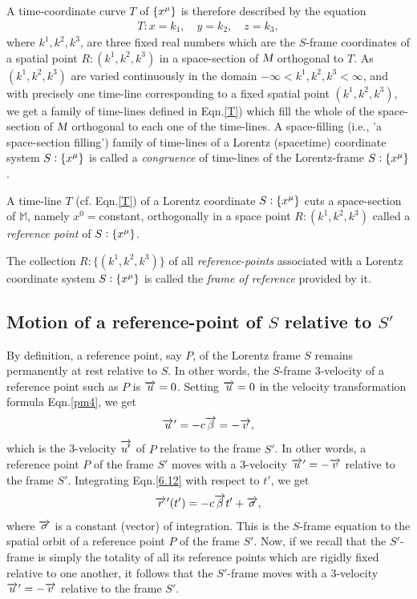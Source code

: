\newpage
A time-coordinate curve $T$ of $\{x^{{\mu}}\}$ is 
therefore  
described by the equation
\begin{align}\label{T}
T:x=k_1, \quad y=k_2,\quad  z=k_3,
\end{align}
where $k^1, k^2, k^3$, are three fixed real numbers 
which are the $S$-frame coordinates of a spatial point 
$R:(k^1,k^2,k^3)$ in a space-section of $\textsl{M}$ 
orthogonal to $T$. As $(k^1,k^2,k^3)$ are varied 
continuously in the domain 
$-\infty<k^1,k^2,k^3<\infty$, and with precisely one 
time-line corresponding to a fixed spatial point 
$(k^1,k^2,k^3)$, we get a family of time-lines defined 
in Eqn.\eqref{T}) which fill the whole of the 
space-section of $\textsl{M}$ orthogonal to each one of 
the time-lines.
\dfn A space-filling (i.e., 'a space-section filling') 
family of time-lines of a Lorentz (spacetime) 
coordinate 
system $S: \{x^{{\mu}}\}$ is called a  \textsl{congruence} 
of 
time-lines of the Lorentz-frame $S: \{x^{{\mu}}\}$. 

\dfn A time-line $T$ (cf. Eqn.\eqref{T}) of a Lorentz 
coordinate $S: \{x^{{\mu}}\}$ cuts a space-section of 
$\mathbb{M}$, namely   $x^0=$constant, orthogonally in 
a 
space point    $R:(k^1,k^2,k^3)$ called a 
\textsl{reference 
point} of $S:\{x^{{\mu}}\}$.

\dfn The collection $R:\{(k^1,k^2,k^3)\}$ of all 
\textsl{reference-points}  associated with a Lorentz 
coordinate system $S: \{x^{{\mu}}\}$ is called the 
\textsl{frame of reference} provided by it.

\subsection{Motion of  a reference-point of {$S$}{} relative to {$S'$}{}}

By definition, a reference point, say $P$, of the 
Lorentz  
frame $S$ remains permanently at rest relative to $S$. 
In 
other words, the $S$-frame 3-velocity of a reference 
point 
such as $P$ is $\overrightarrow{u}=0$. Setting $\overrightarrow{u}=0$ in 
the 
velocity transformation formula Eqn.\eqref{pm4}, we get
\begin{align}\label{6.12}
{\ensuremath{\overrightarrow{u}\hspace*{.3pt}'}}=-c\overrightarrow{{\beta}}=-\overrightarrow{v},
\end{align}
which is the 3-velocity $\overrightarrow{u'}$ of $P$ relative to 
the 
frame $S'$. In other words, a reference point $P$ of 
the 
frame $S'$ moves with a 3-velocity 
${\overrightarrow{u}\hspace*{.3pt}'}=-\overrightarrow{v}$ 
relative to the frame $S'$. Integrating 
Eqn.\eqref{6.12} 
with respect to $t'$, we get
\begin{align}\label{6.13}
{\ensuremath{\overrightarrow{r}\hspace*{.3pt}'}}(t')=-c\overrightarrow{{\beta}}t'+\overrightarrow{{\sigma}},
\end{align}
where $\overrightarrow{{\sigma}}$ is a constant (vector) of 
integration. 
This is the $S$-frame equation to the spatial orbit of 
a 
reference point $P$ of the frame $S'$. Now, if we 
recall 
that the $S'$-frame is simply the totality of all its 
reference points which are rigidly fixed relative to 
one 
another, it follows that the $S'$-frame moves with a 
3-velocity ${\overrightarrow{u}\hspace*{.3pt}'}=-\overrightarrow{v}$ relative to the frame 
$S'$.

